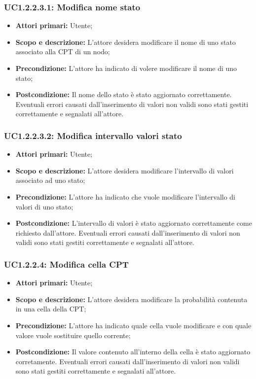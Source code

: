 \subsubsection{UC1.2.2.3.1: Modifica nome stato} 
\begin{itemize} 
	\item{\textbf{Attori primari:} Utente;} 
	\item{\textbf{Scopo e descrizione:} L'attore desidera modificare il nome di uno stato associato alla CPT di un nodo;} 
	\item{\textbf{Precondizione:} L'attore ha indicato di volere modificare il nome di uno stato;} 
	\item{\textbf{Postcondizione:} Il nome dello stato è stato aggiornato correttamente. Eventuali errori causati dall'inserimento di valori non validi sono stati gestiti correttamente e segnalati all'attore.} 
\end{itemize} 
\subsubsection{UC1.2.2.3.2: Modifica intervallo valori stato} 
\begin{itemize} 
	\item{\textbf{Attori primari:} Utente;} 
	\item{\textbf{Scopo e descrizione:} L'attore desidera modificare l'intervallo di valori associato ad uno stato;} 
	\item{\textbf{Precondizione:} L'attore ha indicato che vuole modificare l'intervallo di valori di uno stato;} 
	\item{\textbf{Postcondizione:} L'intervallo di valori è stato aggiornato correttamente come richiesto dall'attore. Eventuali errori causati dall'inserimento di valori non validi sono stati gestiti correttamente e segnalati all'attore.} 
\end{itemize} 
\subsubsection{UC1.2.2.4: Modifica cella CPT} 
\begin{itemize} 
	\item{\textbf{Attori primari:} Utente;} 
	\item{\textbf{Scopo e descrizione:} L'attore desidera modificare la probabilità contenuta in una cella della CPT;} 
	\item{\textbf{Precondizione:} L'attore ha indicato quale cella vuole modificare e con quale valore vuole sostituire quello corrente;} 
	\item{\textbf{Postcondizione:} Il valore contenuto all'interno della cella è stato aggiornato corretamente. Eventuali errori causati dall'inserimento di valori non validi sono stati gestiti correttamente e segnalati all'attore.} 
\end{itemize} 
